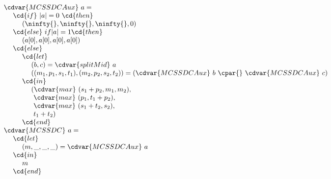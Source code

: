 \begin{cluster}
\label{grp:alg:mcss::linear-work-divide-and-conquer-mcss}

\begin{algorithm}
\label{alg:mcss::linear-work-divide-and-conquer-mcss}
\[
\begin{array}{l}
\cdvar{MCSSDCAux}~a = 
\\
~~~~\cd{if}~|a| = 0~\cd{then}
\\
~~~~~~~~(\ninfty{},\ninfty{},\ninfty{},0)
\\
~~~~\cd{else}~if |a| = 1 \cd{then}
\\
~~~~~~~~(a[0], a[0], a[0], a[0])
\\
~~~~\cd{else}
\\
~~~~~~~~\cd{let} 
\\
~~~~~~~~~~~~(b,c) = \cdvar{splitMid}~a 
\\
~~~~~~~~~~~~((m_1, p_1, s_1, t_1), (m_2, p_2, s_2, t_2)) = (\cdvar{MCSSDCAux}~b~\cpar{}~\cdvar{MCSSDCAux}~c)
\\
~~~~~~~~\cd{in} 
\\
~~~~~~~~~~~~(\cdvar{max}~(s_1+p_2, m_1, m_2),   
\\
~~~~~~~~~~~~~\cdvar{max}~(p_1, t_1+p_2),      
\\
~~~~~~~~~~~~~\cdvar{max}~(s_1+t_2, s_2),     
\\
~~~~~~~~~~~~~t_1+t_2)              
\\
~~~~~~~~\cd{end}
\\
\cdvar{MCSSDC}~a = 
\\
~~~~\cd{let} 
\\
~~~~~~~~(m, \_, \_, \_) = \cdvar{MCSSDCAux}~a 
\\
~~~~\cd{in}
\\
~~~~~~~~m 
\\
~~~~\cd{end}
\end{array}
\]

\end{algorithm}
\end{cluster}

